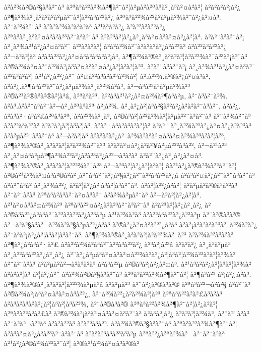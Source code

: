 à²à²¾à²®à²§à³à²¨à³ à²ªà³à²²à²¾à²¶à²¨à²¦à²µà²\circ à²ªà³à²¸à³à²¤à²à²¦ à²à²à²à²¡à²¿ à²¶à²¾à²¸à²à²\circ à²­à²µà²¨à²¦à²²à³à²²à²¿ à²ªà³à²²¾à²²à²­à²µà²¾à²¯à²¿à²¤à³. à²¨à²¾à²¨à³ à²à²à²¾à²à³à²à³ à²¹à³à²à²¿ à²à²²à³à²²à²¿ à²ªà³à²¸à³à²¤à²à²à²³à²¨à³à²¨à³ à²à²³à²¦à²¿à²¸à³à²¤à³à²¤à²¿à²¦à³. à²à²¨à³à²¨à²¡ à²¸à²¾à²¹à²¿à²¤à³à²¯ à²²à³à²à²¦ à²à²à²¾à²¨à³à²à²à²¿à²à²³à³ à²à²²à³à²²à²¿ à²¬à²à²¦à³ à²à³à²³à²¿à²¤à³à²à³à²à²¡à³, à²¶à²¾à²®à²¸à³à²à²¦à²\circ à²²¾à²¯à²³à²¡à²¨à³ à²®à²¾à²¤à²¨à²¾à²¡à³à²¤à³à²¤à²¿à²¦à³à²¦à²³. à²à²¨à³à²¨à²¡ à²¸à²¾à²¹à²¿à²¤à³à²¯ à²²à³à²à²¦ à²¹à²¿à²²¿à²¯ à²¤à²²à³à²à²³à²¾à²¦ à².à²²¾.à²®à²¿à²¤à³à²\circ, à²à²¿.à²¶à³à²³à²¨à²¿à²µà²¾à²¸à²²¾à²à³, à²¬à³à²³à³à²µà²¾à²³ à²®à²¹à²®à³à²®à²¦à³â, à²ªà³à²³. à²²à³à²¹à²¿à²¤à²¾à²¶à³à²µ, à²¨à³à²¯à²¾. à²à³.à²à²¨à³à²¨à²¬à²¸à²ªà³à²ª à²¡à²¾. à²¸à²¿à²¦à³à²§à²²à²¿à²à²à²¯à³à²¯, à²à²¿. à²à³à²·à³à²£à²ªà³à²ª, à²à²²¾à²¸à³, à²®à³à²¦à²²à²¾à²¦à²µà²²¨à³à²¨à³ à²¨à²¾à²¨à³ à²à²²à³à²²à³ à²à²à²¡à²¦à³à²¦à³. à²à²·à³à²à³à²à²¦à³ à²à²¨ à²¸à²¾à²¹à²¿à²¤à²¿à²à²³à³ à²à²µà²²¨à³à²¨à³ à²¬à²à²¦à³ à²­à³à²à²¿à²¯à²¾à²à³à²¤à³à²¤à²¾à²³à²à²¦à²³, à²¶à²¾à²®à²¸à³à²à²¦à²\circ à²²¾à²¯à²³ à²à²à²¤à²¿à²à²¥à²µà²²²à³à²², à²¬à²¹à²³ à²¸à²¤à³à²µà²¶à²¾à²²à²¿à²à²³à²¿à²²¬à³à²à³ à²à²¨à²¿à²¸à²¿à²¤à³. à²¶à²¾à²®à²¸à³à²à²¦à²²²¾à²¯à²³ à²¬à²³à²¦à²¿à²¦à³à²¦ âà²¹à²¿à²®à²¾à²²à²¯à²¦ à²®à²¹à²¾à²¤à³à²®à²\circ à²¸à²¨à³à²¨à²¿à²§à²¿à²¯à²²à³à²²à²¿â à²à³à²¤à²¿à²¯à²¨à³à²¨à³ à²à²¨à³à² à²¸à²¾à²²¿ à²à²¦à²¿à²¦à³à²¦à³à²¨à³. à²à²¦à²²¿à²à²¦ à²à²µà²\circ à²®à³à²²à³ à²¨à²¨à²à³ à²ªà³à²à³à²¯à²¤à³à²¯ à²­à²¾à²µà²¨à³ à²¬à²à²¦à²¿à²¦à³. à²¹à²¤à³à²¤à²¾à²³ à²ªà³à²²¤à²¿à²à²³à²¨à³à²¨à³ à²à²³à²¦à²¿à²¸à²¿ à²à²®à³à²²¿à²à³à²¯à²²à³à²²à²¿à²³à²µ à²¹à²¾à²à³ à²à²²à³à²²à²¿à²³à²µ à²¨à²®à³à²® à²¬à²à²§à³à²¬à²¾à²à²§à²µà²²¿à²à³ à²®à²¿à²¤à³à²²²¿à²à³ à²à²¡à³à²à³à²³à²¯à²¾à²à²¿ à²¨à³à²¡à²¿à²¦à³à²¦à³à²¨à³. à²¶à²¾à²®à²¸à³à²à²¦à²\circ à²²¾à²¯à²³ à²à²¾à²²à³à²à³ à²¶à²¿à²à³à²·à²£ à²à²²à²¾à²à³à²¯à²²à³à²²à²¿ à²³à²¡à²³â à²à²à²¿ à²¸à³à²µà³ à²¸à²²à³à²²à²¿à²¸à²¿ à²¨à²¿à²µà³à²¤à³à²¤à²²¾à²à²¿à²¦à³à²¦à²¾à²³à²à²¦à²¾à² à²¨à²¨à²à³ à²à²µà²\circ à²¬à²à³à²à³ à²à³à²²µ à²®à³à²¡à²¿à²¤à³. à²¹à³à²à²¿à²¦à³à²¦à²¾à² à²à²à²¦à³ à²¦à²¿à²¨ à²à²¾à²®à²§à³à²¨à³ à²ªà³à²²à²¾à²¶à²¨à²¦ à²¶à³à²³ à²¡à²¿.à²à³. à²¶à²¾à²®à²¸à³à²à²¦à²²²¾à²µà³â à²à²µà²³ à²¨à²¿à²®à³à²® à²ªà³à²²¬à²à²§ à²à²¨à³ à²®à²¾à²¡à³à²¤à³à²¤à³à²²¿, à²¯à²¾à²²¿à²à²¾à²¦à²³ à²ªà³à²²à²à²£à³à²à³ à²à³à²à³à²à²¿à²¦à³à²¦à³à²²¾, à²¨à²®à³à²® à²ªà³à²²à²¾à²¶à²¨à²¦à²¿à²à²¦ à²ªà³à²²à²à²£à³ à²®à²¾à²¡à³à²¤à³à²¤à³à²¨à³ à²à³à²¡à²¿ à²à²à²¦à²¾à², à²¨à²¨à²à³ à²¨à²à²¬à²²à³ à²à²à²²à³ à²à²²à³à²². à²à²¾à²®à²§à³à²¨à³ à²ªà³à²²à²¾à²¶à²¨à²¦ à²à³à²¤à²¿à²à²³à²¨à³à²¨à³ à²à³à²³à³à²³à³à²µ à²ªà²²¿à²ªà²¾à²  à²¨à²¨à²à³ à²¹à²¿à²®à²¾à²²à²¯à²¦ à²®à²¹à²¾à²¤à³à²®à²\circ 